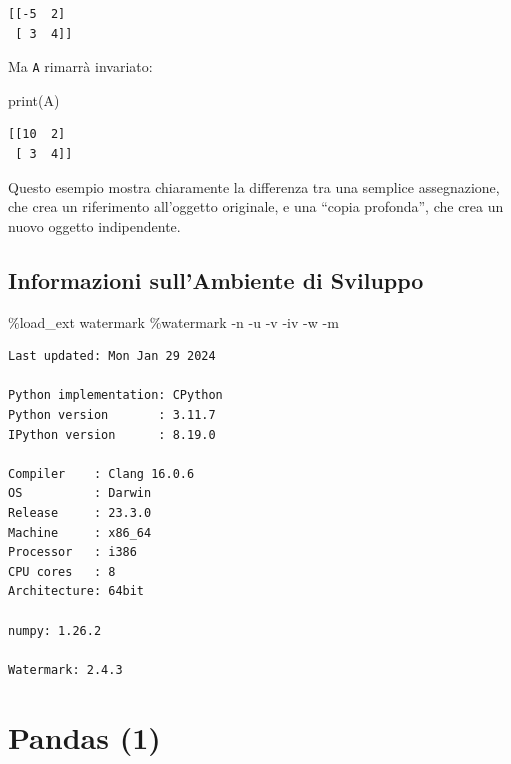 \documentclass[
  letterpaper,
  krantz2]{{[}./krantz{]}}
\newenvironment{Shaded}{\begin{snugshade}}{\end{snugshade}}
\newcommand{\BuiltInTok}[1]{\textcolor[rgb]{0.00,0.23,0.31}{#1}}
\newcommand{\NormalTok}[1]{\textcolor[rgb]{0.00,0.23,0.31}{#1}}
\newcommand{\OperatorTok}[1]{\textcolor[rgb]{0.37,0.37,0.37}{#1}}
\begin{document}
\begin{verbatim}
[[-5  2]
 [ 3  4]]
\end{verbatim}

Ma \texttt{A} rimarrà invariato:

\begin{Shaded}
\begin{Highlighting}[]
\BuiltInTok{print}\NormalTok{(A)}
\end{Highlighting}
\end{Shaded}

\begin{verbatim}
[[10  2]
 [ 3  4]]
\end{verbatim}

Questo esempio mostra chiaramente la differenza tra una semplice
assegnazione, che crea un riferimento all'oggetto originale, e una
``copia profonda'', che crea un nuovo oggetto indipendente.

\section{Informazioni sull'Ambiente di
Sviluppo}\label{informazioni-sullambiente-di-sviluppo-2}

\begin{Shaded}
\begin{Highlighting}[]
\OperatorTok{\%}\NormalTok{load\_ext watermark}
\OperatorTok{\%}\NormalTok{watermark }\OperatorTok{{-}}\NormalTok{n }\OperatorTok{{-}}\NormalTok{u }\OperatorTok{{-}}\NormalTok{v }\OperatorTok{{-}}\NormalTok{iv }\OperatorTok{{-}}\NormalTok{w }\OperatorTok{{-}}\NormalTok{m}
\end{Highlighting}
\end{Shaded}

\begin{verbatim}
Last updated: Mon Jan 29 2024

Python implementation: CPython
Python version       : 3.11.7
IPython version      : 8.19.0

Compiler    : Clang 16.0.6 
OS          : Darwin
Release     : 23.3.0
Machine     : x86_64
Processor   : i386
CPU cores   : 8
Architecture: 64bit

numpy: 1.26.2

Watermark: 2.4.3
\end{verbatim}

\chapter{Pandas (1)}\label{sec-pandas-1}
\end{document}

